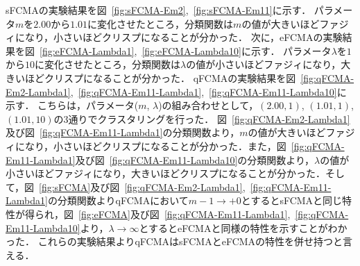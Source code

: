 \documentclass[twocolumn, a4paper]{icethesisabst}
\begin{document}
sFCMAの実験結果を図~\ref{fig:sFCMA-Em2},~\ref{fig:sFCMA-Em11}に示す．
パラメータ$m$を$2.00$から$1.01$に変化させたところ，分類関数は$m$の値が大きいほどファジィになり，小さいほどクリスプになることが分かった．
次に，eFCMAの実験結果を図~\ref{fig:eFCMA-Lambda1},~\ref{fig:eFCMA-Lambda10}に示す．
パラメータ$\lambda$を$1$から$10$に変化させたところ，分類関数は$\lambda$の値が小さいほどファジィになり，大きいほどクリスプになることが分かった．
qFCMAの実験結果を図~\ref{fig:qFCMA-Em2-Lambda1},~\ref{fig:qFCMA-Em11-Lambda1},~\ref{fig:qFCMA-Em11-Lambda10}に示す．
こちらは，パラメータ($m$, $\lambda$)の組み合わせとして，$(2.00, 1)$, $(1.01, 1)$, $(1.01, 10)$の3通りでクラスタリングを行った．
図~\ref{fig:qFCMA-Em2-Lambda1}及び図~\ref{fig:qFCMA-Em11-Lambda1}の分類関数より，$m$の値が大きいほどファジィになり，小さいほどクリスプになることが分かった．また，図~\ref{fig:qFCMA-Em11-Lambda1}及び図~\ref{fig:qFCMA-Em11-Lambda10}の分類関数より，$\lambda$の値が小さいほどファジィになり，大きいほどクリスプになることが分かった．そして，図~\ref{fig:sFCMA}及び図~\ref{fig:qFCMA-Em2-Lambda1},~\ref{fig:qFCMA-Em11-Lambda1}の分類関数よりqFCMAにおいて$m-1\rightarrow+0$とするとsFCMAと同じ特性が得られ，図~\ref{fig:eFCMA}及び図~\ref{fig:qFCMA-Em11-Lambda1},~\ref{fig:qFCMA-Em11-Lambda10}より，$\lambda\rightarrow\infty$とするとeFCMAと同様の特性を示すことがわかった．
これらの実験結果よりqFCMAはsFCMAとeFCMAの特性を併せ持つと言える．
\end{document}
